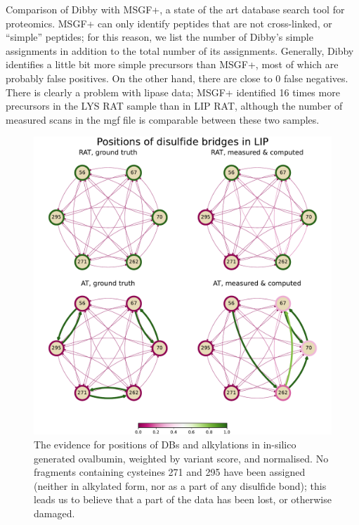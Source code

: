 \begin{table}[]
  \caption{Comparison of Dibby with MSGF+, a state of the art database search tool for proteomics. MSGF+ can only identify peptides that are not cross-linked, or ``simple'' peptides; for this reason, we list the number of Dibby's simple assignments in addition to the total number of its assignments. Generally, Dibby identifies a little bit more simple precursors than MSGF+, most of which are probably false positives. On the other hand, there are close to 0 false negatives. There is clearly a problem with lipase data; MSGF+ identified 16 times more precursors in the LYS RAT sample than in LIP RAT, although the number of measured scans in the mgf file is comparable between these two samples.}\label{tbl:measurements}
\end{table}

\begin{figure}
  \centering
  \includegraphics[width=1\linewidth]{img/lip.pdf}
  \caption{The evidence for positions of DBs and alkylations in in-silico generated ovalbumin, weighted by variant score, and normalised. No fragments containing cysteines 271 and 295 have been assigned (neither in alkylated form, nor as a part of any disulfide bond); this leads us to believe that a part of the data has been lost, or otherwise damaged.}\label{fig:lip}
\end{figure}

